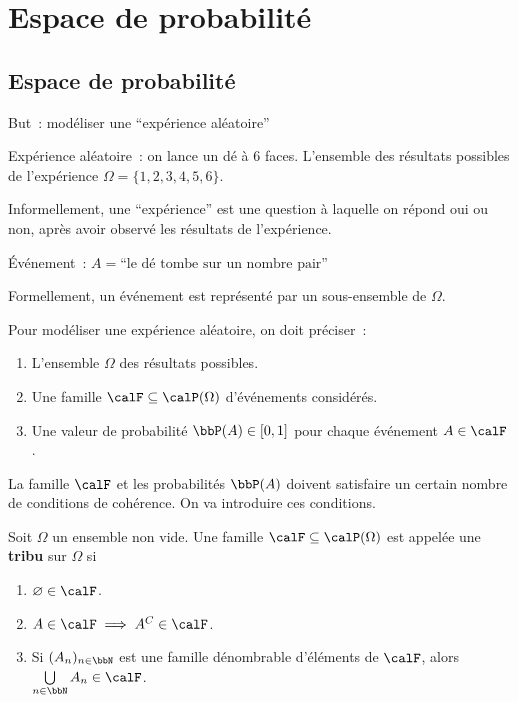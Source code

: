 \chapter{Espace de probabilité}

\section{Espace de probabilité}

But~: modéliser une ``expérience aléatoire''

\begin{exem}
    Expérience aléatoire~: on lance un dé à 6 faces.
    L'ensemble des résultats possibles de l'expérience $\Omega = \{ 1, 2, 3, 4, 5, 6 \}$.
\end{exem}

Informellement, une ``expérience'' est une question à laquelle on répond oui ou non,
après avoir observé les résultats de l'expérience.

\begin{exem}
    Événement~: $A = \text{``le dé tombe sur un nombre pair''}$
\end{exem}

Formellement, un événement est représenté par un sous-ensemble de $\Omega$.

Pour modéliser une expérience aléatoire, on doit préciser~:
\begin{enumerate}
    \item L'ensemble $\Omega$ des résultats possibles.
    \item Une famille $\calF \subseteq \calP(\Omega)$ d'événements considérés.
    \item Une valeur de probabilité $\bbP(A) \in [0, 1]$ pour chaque événement $A \in \calF$.
\end{enumerate}

La famille $\calF$ et les probabilités $\bbP(A)$ doivent satisfaire un certain nombre de conditions de cohérence.
On va introduire ces conditions.

\begin{deff}
    Soit $\Omega$ un ensemble non vide.
    Une famille $\calF \subseteq \calP(\Omega)$ est appelée une \textbf{tribu} sur $\Omega$ si
    \begin{enumerate}
        \item $\varnothing \in \calF$.
        \item $A \in \calF \implies A^C \in \calF$.
        \item Si $(A_n)_{n \in \bbN}$ est une famille dénombrable d'éléments de $\calF$,
              alors $\bigcup\limits_{n \in \bbN} A_n \in \calF$.
    \end{enumerate}
\end{deff}


